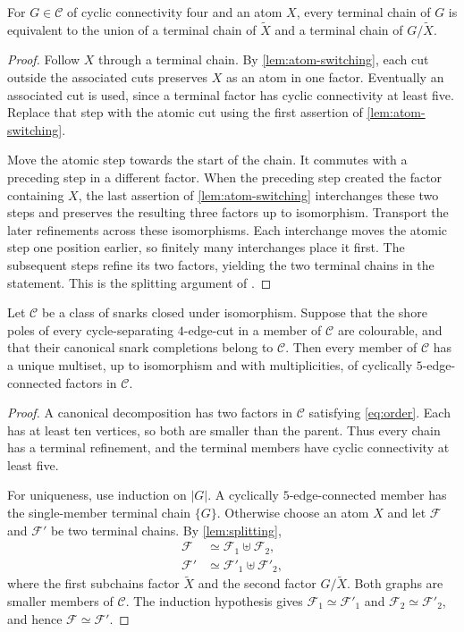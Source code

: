 \documentclass[justified,notoc,twoside,nobib,nofonts]{tufte-handout}
\begin{document}
\begin{lemma}\label{lem:splitting}
For $G\in\mathcal C$ of cyclic connectivity four and an atom $X$,
every terminal chain of $G$ is equivalent to the union of a terminal
chain of $\widetilde X$ and a terminal chain of $G/\widetilde X$.
\end{lemma}
\begin{proof}
Follow $X$ through a terminal chain. By \cref{lem:atom-switching},
each cut outside the associated cuts preserves $X$ as an atom in
one factor. Eventually an associated cut is used, since a terminal
factor has cyclic connectivity at least five.
Replace that step with the atomic cut using the first assertion of
\cref{lem:atom-switching}.

Move the atomic step towards the start of the chain. It commutes
with a preceding step in a different factor. When the preceding
step created the factor containing $X$, the last assertion of
\cref{lem:atom-switching} interchanges these two steps and preserves
the resulting three factors up to isomorphism. Transport the later
refinements across these isomorphisms. Each interchange moves the
atomic step one position earlier, so finitely many interchanges
place it first. The subsequent steps refine its two factors,
yielding the two terminal chains in the statement.
This is the splitting argument of \citep[Lemma~10.2]{CS10}.
\end{proof}

\begin{theorem}\label{thm:criterion}
Let $\mathcal C$ be a class of snarks closed under isomorphism.
Suppose that the shore poles of every cycle-separating $4$-edge-cut
in a member of $\mathcal C$ are colourable, and that their canonical
snark completions belong to $\mathcal C$.
Then every member of $\mathcal C$ has a unique multiset, up to
isomorphism and with multiplicities, of cyclically
$5$-edge-connected factors in $\mathcal C$.
\end{theorem}
\begin{proof}
A canonical decomposition has two factors in $\mathcal C$ satisfying
\eqref{eq:order}. Each has at least ten vertices, so both are smaller
than the parent. Thus every chain has a terminal refinement, and
the terminal members have cyclic connectivity at least five.

For uniqueness, use induction on $|G|$. A cyclically
$5$-edge-connected member has the single-member terminal chain
$\{G\}$. Otherwise choose an atom $X$ and let $\mathcal F$ and
$\mathcal F'$ be two terminal chains. By \cref{lem:splitting},
\[
 \begin{aligned}
 \mathcal F&\simeq\mathcal F_1\uplus\mathcal F_2,\\
 \mathcal F'&\simeq\mathcal F'_1\uplus\mathcal F'_2,
 \end{aligned}
\]
where the first subchains factor $\widetilde X$ and the second
factor $G/\widetilde X$. Both graphs are smaller members of
$\mathcal C$. The induction hypothesis gives
$\mathcal F_1\simeq\mathcal F'_1$ and
$\mathcal F_2\simeq\mathcal F'_2$, and hence
$\mathcal F\simeq\mathcal F'$.
\end{proof}
\end{document}
